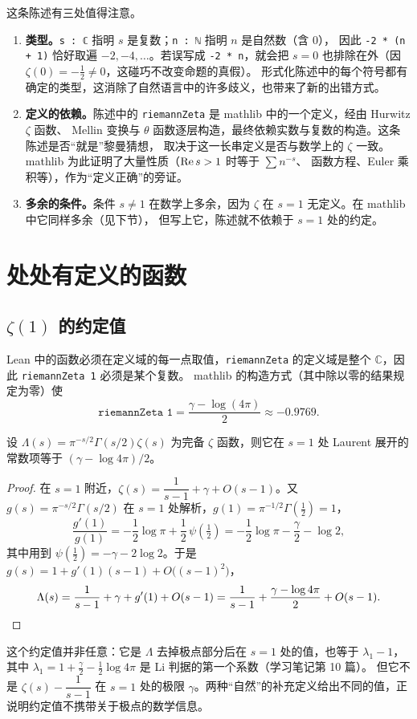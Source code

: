 \documentclass[11pt]{article}
\begin{document}
这条陈述有三处值得注意。
\begin{enumerate}
 \item \textbf{类型。}\texttt{s : ℂ} 指明 $s$ 是复数；\texttt{n : ℕ} 指明 $n$ 是自然数（含 $0$），
 因此 \texttt{-2 * (n + 1)} 恰好取遍 $-2,-4,\dots$。若误写成 \texttt{-2 * n}，就会把 $s=0$ 也排除在外（因 $\zeta(0)=-\tfrac12\ne0$，这碰巧不改变命题的真假）。
 形式化陈述中的每个符号都有确定的类型，这消除了自然语言中的许多歧义，也带来了新的出错方式。
 \item \textbf{定义的依赖。}陈述中的 \texttt{riemannZeta} 是 mathlib 中的一个定义，经由 Hurwitz $\zeta$ 函数、
 Mellin 变换与 $\theta$ 函数逐层构造，最终依赖实数与复数的构造。这条陈述是否“就是”黎曼猜想，
 取决于这一长串定义是否与数学上的 $\zeta$ 一致。mathlib 为此证明了大量性质（$\operatorname{Re} s>1$ 时等于 $\sum n^{-s}$、
 函数方程、Euler 乘积等），作为“定义正确”的旁证。
 \item \textbf{多余的条件。}条件 $s\ne1$ 在数学上多余，因为 $\zeta$ 在 $s=1$ 无定义。在 mathlib 中它同样多余（见下节），
 但写上它，陈述就不依赖于 $s=1$ 处的约定。
\end{enumerate}

\section{处处有定义的函数}
\subsection{$\zeta(1)$ 的约定值}
Lean 中的函数必须在定义域的每一点取值，\texttt{riemannZeta} 的定义域是整个 $\mathbb C$，因此 \texttt{riemannZeta 1} 必须是某个复数。
mathlib 的构造方式（其中除以零的结果规定为零）使
\begin{equation}
 \texttt{riemannZeta 1}=\frac{\gamma-\log(4\pi)}{2}\approx-0.9769 .\tag{3.1}
\end{equation}
\begin{proposition}
设 $\Lambda(s)=\pi^{-s/2}\Gamma(s/2)\zeta(s)$ 为完备 $\zeta$ 函数，则它在 $s=1$ 处 Laurent 展开的常数项等于 $(\gamma-\log4\pi)/2$。
\end{proposition}
\begin{proof}
在 $s=1$ 附近，$\zeta(s)=\dfrac1{s-1}+\gamma+O(s-1)$。又 $g(s)=\pi^{-s/2}\Gamma(s/2)$ 在 $s=1$ 处解析，$g(1)=\pi^{-1/2}\Gamma(\tfrac12)=1$，
\[
 \frac{g'(1)}{g(1)}=-\frac12\log\pi+\frac12\,\psi\!\left(\tfrac12\right)=-\frac12\log\pi-\frac\gamma2-\log2 ,
\]
其中用到 $\psi(\tfrac12)=-\gamma-2\log2$。于是 $g(s)=1+g'(1)(s-1)+O\bigl((s-1)^2\bigr)$，
\[
 \Lambda(s)=\frac1{s-1}+\gamma+g'(1)+O(s-1)=\frac1{s-1}+\frac{\gamma-\log4\pi}{2}+O(s-1). \qedhere
\]
\end{proof}
这个约定值并非任意：它是 $\Lambda$ 去掉极点部分后在 $s=1$ 处的值，也等于 $\lambda_1-1$，
其中 $\lambda_1=1+\tfrac\gamma2-\tfrac12\log4\pi$ 是 Li 判据的第一个系数（学习笔记第 10 篇）。
但它不是 $\zeta(s)-\dfrac1{s-1}$ 在 $s=1$ 处的极限 $\gamma$。两种“自然”的补充定义给出不同的值，正说明约定值不携带关于极点的数学信息。
\end{document}
